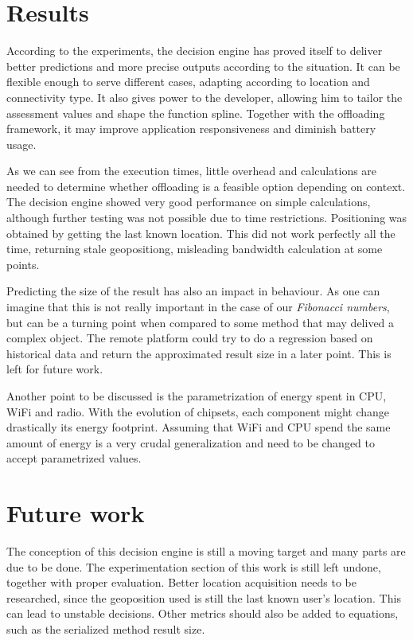 \documentclass[10pt, conference, letterpaper]{IEEEtran}
\begin{document}
  \section{Results}
  According to the experiments, the decision engine has proved itself to deliver better predictions and more precise outputs according to the situation. It can be flexible enough to serve different cases, adapting according to location and connectivity type. It also gives power to the developer, allowing him to tailor the assessment values and shape the function spline. Together with the offloading framework, it may improve application responsiveness and diminish battery usage.
  
  As we can see from the execution times, little overhead and calculations are needed to determine whether offloading is a feasible option depending on context. The decision engine showed very good performance on simple calculations, although further testing was not possible due to time restrictions. Positioning was obtained by getting the last known location. This did not work perfectly all the time, returning stale geopositiong, misleading bandwidth calculation at some points.

  Predicting the size of the result has also an impact in behaviour. As one can imagine that this is not really important in the case of our \textit{Fibonacci numbers}, but can be a turning point when compared to some method that may delived a complex object. The remote platform could try to do a regression based on historical data and return the approximated result size in a later point. This is left for future work.

  Another point to be discussed is the parametrization of energy spent in CPU, WiFi and radio. With the evolution of chipsets, each component might change drastically its energy footprint. Assuming that WiFi and CPU spend the same amount of energy is a very crudal generalization and need to be changed to accept parametrized values. 

  \section{Future work} \label{sec:futurework}

  The conception of this decision engine is still a moving target and many parts are due to be done. The experimentation section of this work is still left undone, together with proper evaluation. Better location acquisition needs to be researched, since the geoposition used is still the last known user's location. This can lead to unstable decisions. Other metrics should also be added to equations, such as the serialized method result size.
\end{document}
